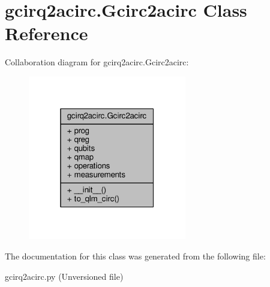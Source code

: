 \hypertarget{classgcirq2acirc_1_1Gcirc2acirc}{\section{gcirq2acirc.\-Gcirc2acirc Class Reference}
\label{classgcirq2acirc_1_1Gcirc2acirc}
}


Collaboration diagram for gcirq2acirc.\-Gcirc2acirc\-:
\nopagebreak
\begin{figure}[H]
\begin{center}
\leavevmode
\includegraphics[width=196pt]{dd/d30/classgcirq2acirc_1_1Gcirc2acirc__coll__graph}
\end{center}
\end{figure}


The documentation for this class was generated from the following file\-:\begin{DoxyCompactItemize}
\item 
gcirq2acirc.\-py (\-Unversioned file)\end{DoxyCompactItemize}
